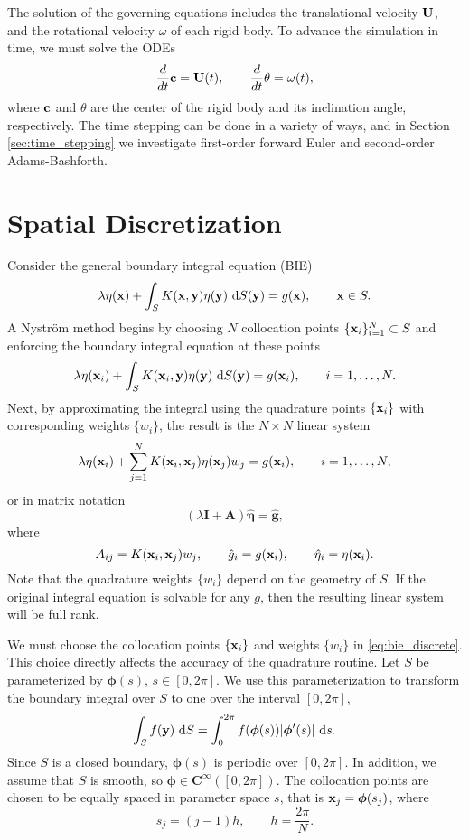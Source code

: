 The solution of the governing equations includes the translational velocity ${\mathbf{U}}$, and the rotational velocity $\omega$ of each rigid body. To advance the simulation in time, we must solve the ODEs
\[ \frac{d}{dt}{\mathbf{c}} = {\mathbf{U}}(t), \qquad \frac{d}{dt}\theta = \omega(t),\]
where ${\mathbf{c}}$ and $\theta$ are the center of the rigid body and its inclination angle, respectively. The time stepping can be done in a variety of ways, and in Section \ref{sec:time_stepping} we investigate first-order forward Euler and second-order Adams-Bashforth. 

\section{Spatial Discretization}\label{sec:discretization}

Consider the general boundary integral equation (BIE)
\begin{equation}\label{eq:bie_example} \lambda \eta({\mathbf{x}}) + \int_S K({\mathbf{x}},{\mathbf{y}})\eta({\mathbf{y}})~\text{d}S({\mathbf{y}}) = g({\mathbf{x}}),\qquad {\mathbf{x}}\in S.\end{equation}
A Nystr\"{o}m method begins by choosing $N$ collocation points $\{{\mathbf{x}}_i \}_{i=1}^N \subset S$ and enforcing the boundary integral equation \label{eq:bie_example} at these points
\[  \lambda \eta({\mathbf{x}}_i) + \int_S K({\mathbf{x}}_i,{\mathbf{y}})\eta({\mathbf{y}})~\text{d}S({\mathbf{y}}) = g({\mathbf{x}}_i), \qquad i = 1,\hdots, N.\]
Next, by approximating the integral  using the quadrature points $\{{\mathbf{x}}_i\}$ with corresponding weights $\{w_i\}$, the result is the $N\times N$ linear system
\begin{equation}\label{eq:bie_discrete} \lambda \eta({\mathbf{x}}_i) + \sum\limits_{j=1}^N  K({\mathbf{x}}_i, {\mathbf{x}}_j)\eta({\mathbf{x}}_j)w_j = g({\mathbf{x}}_i),\qquad i = 1,\hdots, N,\end{equation}
or in matrix notation
\[ \left(\lambda \mathbf{I} + \mathbf{A}\right)\hat{\bm{\eta}} = \hat{\mathbf{g}},\]
where 
\[ A_{ij} = K({\mathbf{x}}_i,{\mathbf{x}}_j)w_j,\qquad \hat{g}_i = g({\mathbf{x}}_i), \qquad \hat{\eta}_i = \eta({\mathbf{x}}_i).\]
 Note that the quadrature weights $\{w_i\}$ depend on the geometry of $S$. If the original integral equation is solvable for any $g$, then the resulting linear system will be full rank.

We must choose the collocation points $\{{\mathbf{x}}_i\}$ and weights $\{w_i\}$ in \eqref{eq:bie_discrete}.  This choice directly affects the accuracy of the quadrature routine. Let $S$ be parameterized by $\bm{\phi}(s)$, $s\in [0,2\pi]$. We use this parameterization to transform the boundary integral over $S$ to one over the interval $[0,2\pi]$,
\[ \int_S f({\mathbf{y}})~\text{d}S = \int_0^{2\pi} f(\bm{\phi}(s))|\bm{\phi}'(s)|~\text{d}s.\]
Since $S$ is a closed boundary, $\bm{\phi}(s)$ is periodic over $[0,2\pi]$. In addition, we assume that $S$ is smooth, so $\bm{\phi}\in\textbf{C}^\infty([0,2\pi])$.  The collocation points are chosen to be equally spaced in parameter space $s$, that is ${\mathbf{x}}_j =\bm{\phi}(s_j)$, where
\[  s_j = (j-1) h,\qquad h = \frac{2\pi}{N}.\] 

